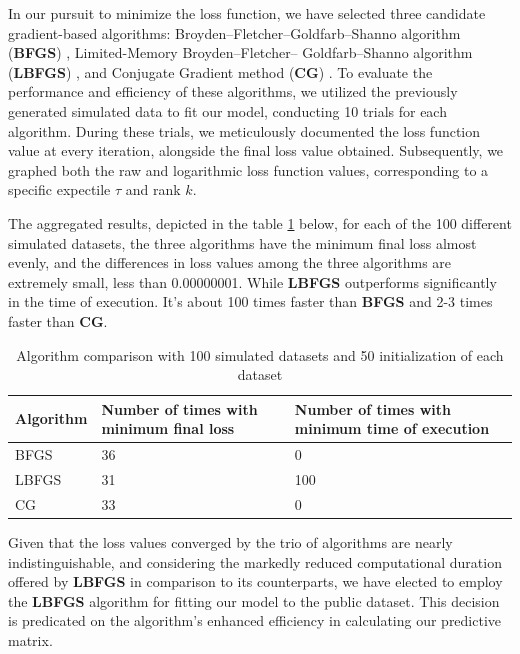 \documentclass{article}
\begin{document}
In our pursuit to minimize the loss function, we have selected three candidate gradient-based algorithms: Broyden–Fletcher–Goldfarb–Shanno algorithm (\textbf{BFGS}) \cite{35d0019d-775a-3628-b0b4-67be112e346b}, Limited-Memory Broyden–Fletcher– Goldfarb–Shanno algorithm (\textbf{LBFGS}) \cite{liu1989limited}, and Conjugate Gradient method (\textbf{CG}) \cite{hestenes1952methods}. To evaluate the performance and efficiency of these algorithms, we utilized the previously generated simulated data to fit our model, conducting 10 trials for each algorithm. During these trials, we meticulously documented the loss function value at every iteration, alongside the final loss value obtained. Subsequently, we graphed both the raw and logarithmic loss function values, corresponding to a specific expectile $\tau$ and rank $k$.

The aggregated results, depicted in the table \ref{tab:algorithm_simulation} below, for each of the 100 different simulated datasets, the three algorithms have the minimum final loss almost evenly, and the differences in loss values among the three algorithms are extremely small, less than 0.00000001. While \textbf{LBFGS} outperforms significantly in the time of execution. It's about 100 times faster than \textbf{BFGS} and 2-3 times faster than \textbf{CG}.

\begin{table}[H]
    \centering
    \begin{tabular}{|p{2cm}|p{4.5cm}|p{4.5cm}|}
    \hline
     \textbf{Algorithm}    & Number of times with minimum final loss & Number of times with minimum time of execution \\
     \hline
     BFGS    & 36 & 0\\
     \hline
     LBFGS & 31 & 100\\
     \hline
     CG & 33 & 0\\
     \hline
    \end{tabular}
    \caption{Algorithm comparison with 100 simulated datasets and 50 initialization of each dataset}
    \label{tab:algorithm_simulation}
\end{table}

Given that the loss values converged by the trio of algorithms are nearly indistinguishable, and considering the markedly reduced computational duration offered by \textbf{LBFGS} in comparison to its counterparts, we have elected to employ the \textbf{LBFGS} algorithm for fitting our model to the public dataset. This decision is predicated on the algorithm's enhanced efficiency in calculating our predictive matrix.
\end{document}
